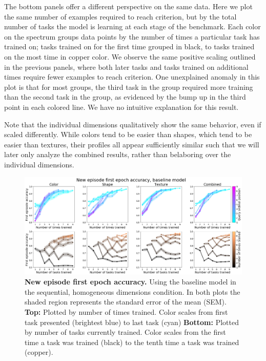 The bottom panels offer a different perspective on the same data. Here we plot the same number of examples required to reach criterion, but by the total number of tasks the model is learning at each stage of the benchmark. Each color on the spectrum groups data points by the number of times a particular task has trained on; tasks trained on for the first time grouped in black, to tasks trained on the most time in copper color. We observe the same positive scaling outlined in the previous panels, where both later tasks and tasks trained on additional times require fewer examples to reach criterion. One unexplained anomaly in this plot is that for most groups, the third task in the group required more training than the second task in the group, as evidenced by the bump up in the third point in each colored line. We have no intuitive explanation for this result. 

Note that the individual dimensions qualitatively show the same behavior, even if scaled differently. While colors tend to be easier than shapes, which tend to be easier than textures, their profiles all appear sufficiently similar such that we will later only analyze the combined results, rather than belaboring over the individual dimensions. 

\begin{figure}[!htb]
\centering
\includegraphics[width=\linewidth]{ch-results/figures/baseline_sequential/first_episode_accuracy.png}
\caption{ {\bf New episode first epoch accuracy.} Using the baseline model in the sequential, homogeneous dimensions condition. In both plots the shaded region represents the standard error of the mean (SEM). \textbf{Top:} Plotted by number of times trained. Color scales from first task presented (brightest blue) to last task (cyan) \textbf{Bottom:} Plotted by number of tasks currently trained. Color scales from the first time a task was trained (black) to the tenth time a task was trained (copper).}
\label{fig:results-baseline-sequential-first-episode-accuracy}
\end{figure}

